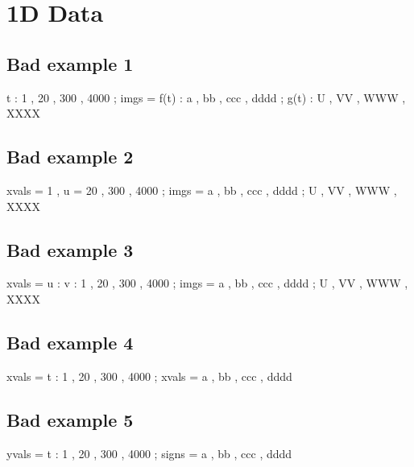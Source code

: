 \documentclass[12pt]{article}
\begin{document}


\section{1D Data}

\subsection{Bad example 1}

\begin{functable}
               t : 1 , 20 , 300 , 4000 ;
    imgs  = f(t) : a , bb , ccc , dddd ;
            g(t) : U , VV , WWW , XXXX
\end{functable}


\subsection{Bad example 2}

\begin{functable}
    xvals = 1 , u = 20 , 300 , 4000 ;
    imgs  = a , bb , ccc , dddd ;
            U , VV , WWW , XXXX
\end{functable}


\subsection{Bad example 3}

\begin{functable}
    xvals = u : v : 1 , 20 , 300 , 4000 ;
    imgs  = a , bb , ccc , dddd ;
            U , VV , WWW , XXXX
\end{functable}



\subsection{Bad example 4}

\begin{functable}
    xvals = t : 1 , 20 , 300 , 4000 ;
    xvals = a , bb , ccc , dddd 
\end{functable}



\subsection{Bad example 5}

\begin{functable}
    yvals = t : 1 , 20 , 300 , 4000 ;
    signs = a , bb , ccc , dddd 
\end{functable}
\end{document}
